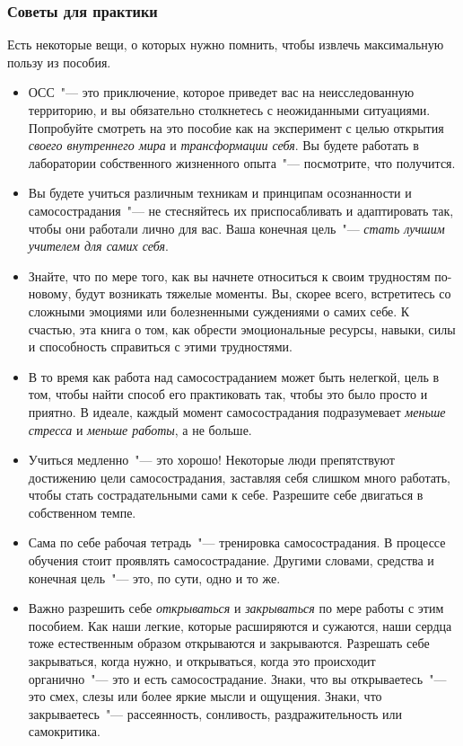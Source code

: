 	
	\subsubsection*{Советы для практики}
	
	Есть некоторые вещи, о которых нужно помнить, чтобы извлечь максимальную пользу из пособия.  
	\begin{itemize}
		\item ОСС~"--- это приключение, которое приведет вас на неисследованную территорию, и вы обязательно столкнетесь с неожиданными ситуациями.  Попробуйте смотреть на это пособие как на эксперимент с целью открытия \emph{своего внутреннего мира} и \emph{трансформации себя}. Вы будете работать в лаборатории собственного жизненного опыта~"--- посмотрите, что получится.
		\item Вы будете учиться различным техникам и принципам осознанности и самосострадания~"--- не стесняйтесь их приспосабливать и адаптировать так, чтобы они работали лично для вас. Ваша конечная цель~"--- \emph{стать лучшим учителем для самих себя}.
		\item Знайте, что по мере того, как вы начнете относиться к своим трудностям по-новому, будут возникать тяжелые моменты. Вы, скорее всего, встретитесь со сложными эмоциями или болезненными суждениями о самих себе. К счастью, эта книга о том, как обрести эмоциональные ресурсы, навыки, силы и способность справиться с этими трудностями. 
		\item В то время как работа над самосостраданием может быть нелегкой, цель в том, чтобы найти способ его практиковать так, чтобы это было просто и приятно. В идеале,  каждый момент самосострадания подразумевает \emph{меньше стресса} и \emph{меньше работы}, а не больше. 
		\item Учиться медленно~"--- это хорошо! Некоторые люди препятствуют достижению цели самосострадания, заставляя себя слишком много работать, чтобы стать сострадательными сами к себе. Разрешите себе двигаться в собственном темпе. 
		\item Сама по себе рабочая тетрадь~"--- тренировка самосострадания. В процессе обучения стоит проявлять самосострадание. Другими словами, средства и конечная цель~"--- это, по сути, одно и то же.
		\item Важно разрешить себе \emph{открываться} и \emph{закрываться} по мере работы с этим пособием. Как наши легкие, которые расширяются и сужаются, наши сердца тоже естественным образом открываются и закрываются. Разрешать себе закрываться, когда нужно, и открываться, когда это происходит органично~"--- это и есть самосострадание. Знаки, что вы открываетесь~"--- это смех, слезы или более яркие мысли и ощущения. Знаки, что закрываетесь~"--- рассеянность, сонливость, раздражительность или самокритика.

\end{itemize}
